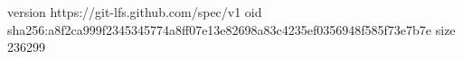 version https://git-lfs.github.com/spec/v1
oid sha256:a8f2ca999f2345345774a8ff07e13e82698a83c4235ef0356948f585f73e7b7e
size 236299

